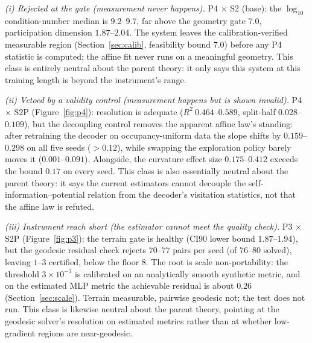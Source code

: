 \documentclass{article}
\begin{document}
\emph{(i) Rejected at the gate (measurement never happens).} P4 $\times$ S2
(base): the $\log_{10}$ condition-number median is $9.2$--$9.7$, far above the
geometry gate $7.0$, participation dimension $1.87$--$2.04$. The system leaves the
calibration-verified measurable region (Section~\ref{sec:calib}, feasibility
bound $7.0$) before any P4 statistic is computed; the affine fit never runs on a
meaningful geometry. This class is entirely neutral about the parent theory: it
only says this system at this training length is beyond the instrument's range.

\emph{(ii) Vetoed by a validity control (measurement happens but is shown
invalid).} P4 $\times$ S2P (Figure~\ref{fig:p4}): resolution is adequate ($R^2\
0.464$--$0.589$, split-half $0.028$--$0.109$), but the decoupling control removes
the apparent
affine law's standing: after retraining the decoder on occupancy-uniform data
the slope shifts by $0.159$--$0.298$ on all five seeds ($>0.12$), while swapping
the exploration policy barely moves it ($0.001$--$0.091$). Alongside, the
curvature effect size $0.175$--$0.412$ exceeds the bound $0.17$ on every seed.
This class is also essentially neutral about the parent theory: it says the
current estimators cannot decouple the self-information--potential relation from
the decoder's visitation statistics, not that the affine law is refuted.

\emph{(iii) Instrument reach short (the estimator cannot meet the quality
check).} P3 $\times$ S2P (Figure~\ref{fig:p3}): the terrain gate is healthy (CI90
lower bound $1.87$--$1.94$), but the geodesic residual check rejects $70$--$77$
pairs per
seed (of $76$--$80$ solved), leaving $1$--$3$ certified, below the floor $8$. The
root is scale non-portability: the threshold $3\times10^{-3}$ is calibrated on an
analytically smooth synthetic metric, and on the estimated MLP metric the
achievable residual is about $0.26$ (Section~\ref{sec:scale}). Terrain
measurable, pairwise geodesic not; the test does not run. This class is likewise
neutral about the parent theory, pointing at the geodesic solver's resolution on
estimated metrics rather than at whether low-gradient regions are near-geodesic.
\end{document}
